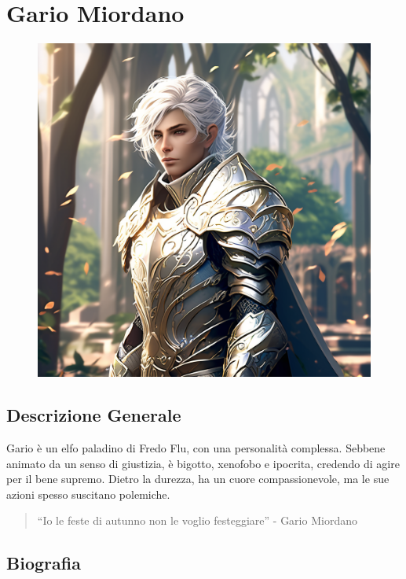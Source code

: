 \section{Gario Miordano}\label{gario-miordano}


\begin{figure}
\centering
\includegraphics{depict-an-elf-paladin-he-is-a-young-adult-with-short-white-hairs-wearing-full-plate-armour.png}
\end{figure}

\subsection{Descrizione Generale}\label{descrizione-generale}



Gario è un elfo paladino di Fredo Flu, con una personalità complessa.
Sebbene animato da un senso di giustizia, è bigotto, xenofobo e
ipocrita, credendo di agire per il bene supremo. Dietro la durezza, ha
un cuore compassionevole, ma le sue azioni spesso suscitano polemiche.

\begin{quote}
``Io le feste di autunno non le voglio festeggiare'' - Gario Miordano
\end{quote}

\subsection{Biografia}\label{biografia}


